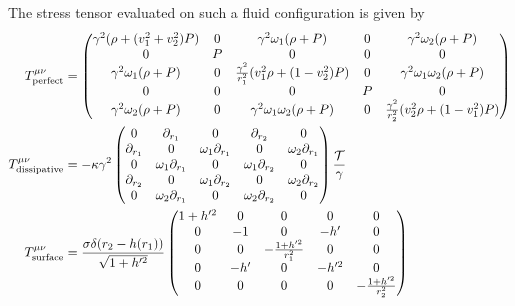 The stress tensor evaluated on such a fluid configuration is given
by
%
\begin{equation*}
\begin{split}
  T^{\mu\nu}_\mathrm{perfect} &=
    \begin{pmatrix}
      \gamma^2(\rho+(v_1^2+v_2^2)P) & 0 & \gamma^2\omega_1(\rho+P) & 0 & \gamma^2\omega_2(\rho+P) \\
      0 & P & 0 & 0 & 0 \\
      \gamma^2\omega_1(\rho+P) & 0 & \frac{\gamma^2}{r_1^2}(v_1^2\rho+(1-v_2^2)P) & 0 & \gamma^2\omega_1\omega_2(\rho+P) \\
      0 & 0 & 0 & P & 0 \\
      \gamma^2\omega_2(\rho+P) & 0 & \gamma^2\omega_1\omega_2(\rho+P) & 0 & \frac{\gamma^2}{r_2^2}(v_2^2\rho+(1-v_1^2)P) \\
    \end{pmatrix}
     \\
  T^{\mu\nu}_\mathrm{dissipative} &=-\kappa\gamma^2
    \begin{pmatrix}
      0        & \partial_{r_1}         & 0                & \partial_{r_2}         & 0 \\
      \partial_{r_1} & 0                & \omega_1\partial_{r_1} & 0                & \omega_2\partial_{r_1} \\
      0        & \omega_1\partial_{r_1} & 0                & \omega_1\partial_{r_2} & 0 \\
      \partial_{r_2} & 0                & \omega_1\partial_{r_2} & 0                & \omega_2\partial_{r_2} \\
      0        & \omega_2\partial_{r_1} & 0                & \omega_2\partial_{r_2} & 0 \\
    \end{pmatrix}\frac{\mathcal{T}}{\gamma}
     \\
  T^{\mu\nu}_\mathrm{surface} &=\frac{\sigma\delta(r_2-h(r_1))}{\sqrt{1+h'^2}}
    \begin{pmatrix}
      1+h'^2 & 0   & 0                     & 0     & 0 \\
      0      & -1  & 0                     & -h'   & 0 \\
      0      & 0   & -\frac{1+h'^2}{r_1^2} & 0     & 0 \\
      0      & -h' & 0                     & -h'^2 & 0 \\
      0      & 0   & 0                     & 0     & -\frac{1+h'^2}{r_2^2} \\
    \end{pmatrix}
\end{split}
\end{equation*}
%

